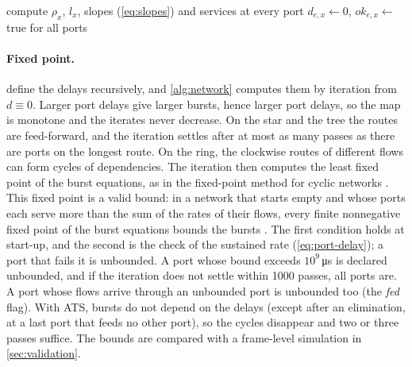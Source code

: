 \begin{algorithm2e}[t]
\caption{\textsf{Network}$(\{h\})$: bounds of all flows}
\label{alg:network}
compute $\rho_x$, $l_x$, slopes (\cref{eq:slopes}) and services at every port\;
$d_{e,x}\gets0$, $\textit{ok}_{e,x}\gets$\,true for all ports\;
\end{algorithm2e}

\paragraph{Fixed point.}  define
the delays recursively, and \cref{alg:network} computes them by iteration
from $d\equiv0$. Larger port delays give larger bursts, hence larger
port delays, so the map is monotone and the iterates never decrease. On the star and the tree the routes are feed-forward, and the
iteration settles after at most as many passes as there are ports on the
longest route. On the ring, the clockwise routes of different flows can
form cycles of dependencies. The iteration then computes the least fixed
point of the burst equations, as in the fixed-point method for cyclic
networks \cite{leboudec2001network}. This fixed point is a valid bound: in
a network that starts empty and whose ports each serve more than the sum
of the rates of their flows, every finite nonnegative fixed point of the
burst equations bounds the bursts \cite[Thm.~2]{thomas2019cyclic}. The
first condition holds at start-up, and the second is the check of the
sustained rate (\cref{eq:port-delay}); a port that fails it is
unbounded. A port whose bound exceeds $10^9$\,\si{\micro s} is declared
unbounded, and if the iteration does not settle within 1000 passes, all
ports are. A port whose flows arrive through an unbounded port is
unbounded too (the \textit{fed} flag). With ATS, bursts do not depend on
the delays (except after an elimination, at a last port that feeds no other
port), so the cycles disappear and two or three passes suffice. The bounds
are compared with a frame-level simulation in \cref{sec:validation}.

